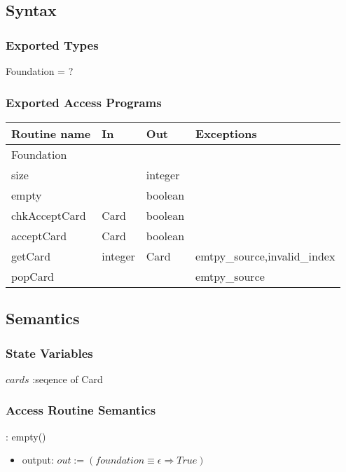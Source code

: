 \documentclass[12pt,fleqn]{article}
\begin{document}
\subsection* {Syntax}

\subsubsection* {Exported Types}
Foundation = ?

\subsubsection* {Exported Access Programs}

\begin{tabular}{| l | l | l | l |}
\hline
\textbf{Routine name} & \textbf{In} & \textbf{Out} & \textbf{Exceptions}\\
\hline
Foundation & ~ & ~ & ~\\
\hline
size & ~ & integer & ~\\
\hline
empty & ~ & boolean & ~\\
\hline
chkAcceptCard & Card & boolean & ~\\
\hline
acceptCard & Card & boolean &  ~\\
\hline
getCard & integer & Card & emtpy\_source,invalid\_index\\
\hline
popCard & ~ & ~& emtpy\_source\\
\hline

\end{tabular}

\subsection* {Semantics}

\subsubsection* {State Variables}
$cards$ :seqence of Card

\subsubsection* {Access Routine Semantics}

\noindent : empty()
\begin{itemize}
\item output: $out := (foundation \equiv \epsilon \Rightarrow True)$
\end{itemize}
\end{document}
